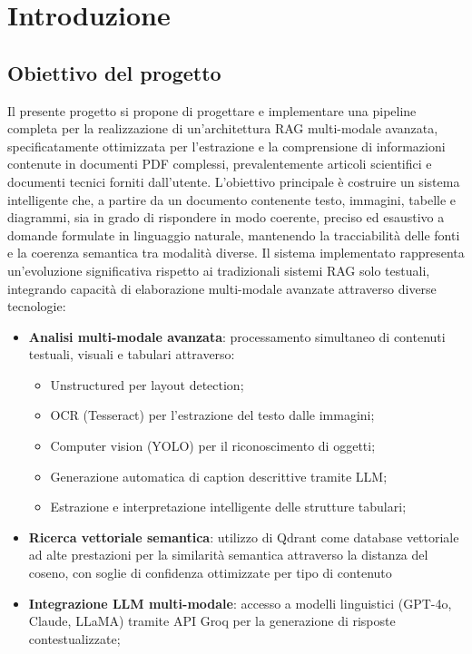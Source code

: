 \section{Introduzione}

\subsection{Obiettivo del progetto}
Il presente progetto si propone di progettare e implementare una pipeline completa per la realizzazione di un'architettura RAG multi-modale avanzata, specificatamente ottimizzata per l'estrazione e la comprensione di informazioni contenute in documenti PDF complessi, prevalentemente articoli scientifici e documenti tecnici forniti dall'utente. L'obiettivo principale è costruire un sistema intelligente che, a partire da un documento contenente testo, immagini, tabelle e diagrammi, sia in grado di rispondere in modo coerente, preciso ed esaustivo a domande formulate in linguaggio naturale, mantenendo la tracciabilità delle fonti e la coerenza semantica tra modalità diverse. Il sistema implementato rappresenta un'evoluzione significativa rispetto ai tradizionali sistemi RAG solo testuali, integrando capacità di elaborazione multi-modale avanzate attraverso diverse tecnologie:

\begin{itemize} 
    \item \textbf{Analisi multi-modale avanzata}: processamento simultaneo di contenuti testuali, visuali e tabulari attraverso: 
    \begin{itemize}
        \item Unstructured per layout detection;
    \end{itemize}
    \begin{itemize} 
        \item OCR (Tesseract) per l'estrazione del testo dalle immagini;
        \item Computer vision (YOLO) per il riconoscimento di oggetti; 
        \item Generazione automatica di caption descrittive tramite LLM; 
        \item Estrazione e interpretazione intelligente delle strutture tabulari; 
    \end{itemize} 
    \item \textbf{Ricerca vettoriale semantica}: utilizzo di Qdrant come database vettoriale ad alte prestazioni per la similarità semantica attraverso la distanza del coseno, con soglie di confidenza ottimizzate per tipo di contenuto \item \textbf{Integrazione LLM multi-modale}: accesso a modelli linguistici  (GPT-4o, Claude, LLaMA) tramite API Groq per la generazione di risposte contestualizzate; 
\end{itemize}

